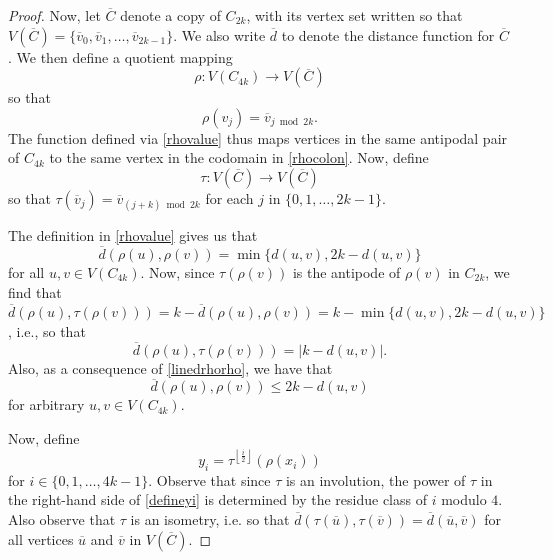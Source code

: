 \documentclass[10pt,a4paper]{amsart}
\begin{document}
\begin{proof}
 Now, let $\overline{C}$ denote a copy of $C_{2k}$, 
 with its vertex set written so that 
 $V(\overline{C}) = \{ \overline{v}_{0}, \overline{v}_{1}, \ldots, \overline{v}_{2k-1} \}$. 
 We also write $\overline{d}$ to denote the distance function for $\overline{C}$. 
 We then define a quotient mapping 
\begin{equation}\label{rhocolon} 
 \rho\colon V(C_{4k}) \to V(\overline{C})
\end{equation}
 so that 
\begin{equation}\label{rhovalue}
 \rho(v_{j}) = \overline{v}_{j \bmod {2k}}. 
\end{equation} 
 The function defined via \eqref{rhovalue} thus maps vertices in the same antipodal pair of $C_{4k}$
 to the same vertex in the codomain in \eqref{rhocolon}. 
 Now, define
\begin{equation}\label{taucolon}
 \tau\colon V(\overline{C}) \to V(\overline{C})
\end{equation}
 so that 
 $ 
 \tau(\overline{v}_{j}) = \overline{v}_{(j+k) \bmod {2k}} $ 
 for each $j$ in $ \{ 0, 1, \ldots, 2k-1 \}$. 

 The definition in \eqref{rhovalue} gives us that 
\begin{equation}\label{linedrhorho}
 \overline{d}(\rho(u), \rho(v)) = \min\{ d(u, v), 2 k - d(u, v) \} 
\end{equation}
 for all $u, v \in V(C_{4k})$. 
 Now, since $\tau(\rho(v))$ is the antipode of $\rho(v)$ in $C_{2k}$, we find that 
$ \overline{d}(\rho(u), \tau(\rho(v)))
 = k - \overline{d}(\rho(u), \rho(v)) 
 = k - \min\{ d(u, v), 2 k - d(u, v) \}$, i.e., so that 
\begin{equation}\label{abskduv}
 \overline{d}(\rho(u), \tau(\rho(v))) = \left| k - d(u, v) \right|. 
\end{equation}
 Also, as a consequence of \eqref{linedrhorho}, we have that 
\begin{equation}\label{2kminusduv} 
 \overline{d}(\rho(u), \rho(v)) \leq 2 k - d(u, v) 
\end{equation}
 for arbitrary $u, v \in V(C_{4k})$. 

 Now, define
\begin{equation}\label{defineyi}
 y_{i} = \tau^{\left\lfloor \frac{i}{2} \right\rfloor}\left( \rho(x_{i}) \right) 
\end{equation}
 for $i \in \{ 0, 1, \ldots, 4k-1 \}$. 
 Observe that since $\tau$ is an involution, 
 the power of $\tau$ in the right-hand side of \eqref{defineyi} is determined by the residue class of $i$ modulo $4$.
 Also observe that $\tau$ is an isometry, i.e. 
 so that 
 $ \overline{d}\left( \tau(\overline{u}), \tau(\overline{v}) \right) 
 = \overline{d}\left( \overline{u}, \overline{v} \right) $ 
 for all vertices $\overline{u}$ and $\overline{v}$ in $V(\overline{C})$. 
 

\end{proof}
\end{document}
